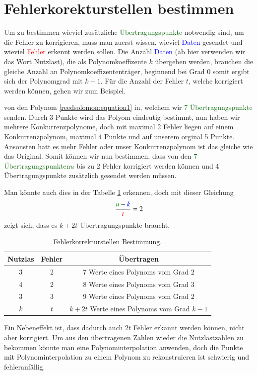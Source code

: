 \section{Fehlerkorekturstellen bestimmen
\label{reedsolomon:section:Fehlerkorrekturstellen}}
Um zu bestimmen wieviel zusätzliche \textcolor{darkgreen}{Übertragungspunkte} notwendig sind, um die Fehler zu korrigieren,
muss man zuerst wissen, wieviel \textcolor{blue}{Daten} gesendet und wieviel \textcolor{red}{Fehler} erkennt werden sollen. 
Die Anzahl \textcolor{blue}{Daten} (ab hier verwenden wir das Wort Nutzlast), die als Polynomkoeffizente $k$ übergeben werden, 
brauchen die gleiche Anzahl an Polynomkoeffizententräger, beginnend bei Grad 0 somit ergibt sich der Polynomgrad mit $k-1$.
Für die Anzahl der Fehler $t$, welche korrigiert werden können, gehen wir zum Beispiel.
\begin{beispiel} von den Polynom \ref{reedsolomon:equation1} in, welchem wir  \textcolor{darkgreen}{7 Übertragungspunkte} senden.
Durch 3 Punkte wird das Polyom eindeutig bestimmt, nun haben wir mehrere Konkurrenzpolynome, doch mit maximal 2 Fehler liegen auf einem Konkurrenzpolynom,
maximal 4 Punkte und auf unserem orginal 5 Punkte. Ansonsten hatt es mehr Fehler oder unser Konkurrenzpolynom ist das gleiche wie das Original. 
Somit können wir nun bestimmen, dass von den \textcolor{darkgreen}{7 Übertragungspunkten$u$} bis zu 2 Fehler korrigiert werden können und 4 Übertragungspunkte zusätzlich gesendet werden müssen.
\end{beispiel}
Man könnte auch dies in der Tabelle \ref{tab:fehlerkorrekturstellen} erkennen, doch mit dieser Gleichung
\begin{equation}
    \frac{\textcolor{darkgreen}{u}-\textcolor{blue}{k}}{\textcolor{red}{t}}
    =2
    \label{reedsolomon:equation2}
\end{equation}
zeigt sich, dass es $k+2t$ Übertragungspunkte braucht.

\begin{table}
    \begin{tabular}{ c c | c} 
        \hline
        Nutzlas & Fehler & Übertragen \\
        \hline 
        3 & 2 & 7 Werte eines Polynoms vom Grad 2 \\ 
        4 & 2 & 8 Werte eines Polynoms vom Grad 3 \\
        3 & 3 & 9 Werte eines Polynoms vom Grad 2 \\ 
        \hline
        $k$ & $t$ & $k+2t$ Werte eines Polynoms vom Grad $k-1$ \\ 
        \hline
    \end{tabular}
    \caption{\label{tab:fehlerkorrekturstellen} Fehlerkorrekturstellen Bestimmung.}
\end{table}

Ein Nebeneffekt ist, dass dadurch auch $2t$ Fehler erkannt werden können, nicht aber korrigiert.
Um aus den übertragenen Zahlen wieder die Nutzlastzahlen zu bekommen könnte man eine Polynominterpolation anwenden,
doch die Punkte mit Polynominterpolation zu einem Polynom zu rekonstruieren ist schwierig und fehleranfällig.


